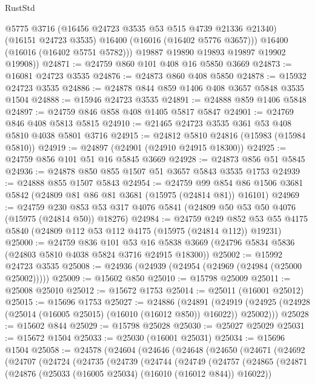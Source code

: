 \begin{lexlean}{RustStd}
\begin{coremodule}
            @5775
            @3716
            (@16456 @24723 @3535 @53 @515 @4739 @21336 @21340)
            (@16151 @24723 @3535)
            @16400
            (@16016 (@16402 @5776 @3657)))
          @16400
          (@16016 (@16402 @5751 @5782)))
        @19887
        @19890
        @19893
        @19897
        @19902
        @19908))
@24871 := @24759 @860 @101 @408 @16 @5850 @3669
@24873 := @16081 @24723 @3535
@24876 := @24873 @860 @408 @5850
@24878 := @15932 @24723 @3535
@24886 := @24878 @844 @859 @1406 @408 @3657 @5848 @3535 @1504
@24888 := @15946 @24723 @3535
@24891 := @24888 @859 @1406 @5848
@24897 := @24759 @846 @858 @408 @1405 @5817 @5847
@24901 := @24769 @846 @408 @5813 @5815
@24910 := @21465 @24723 @3535 @361 @53 @408 @5810 @4038 @5801 @3716
@24915 := @24812 @5810 @24816 (@15983 (@15984 @5810))
@24919 := @24897 (@24901 (@24910 @24915 @18300))
@24925 := @24759 @856 @101 @51 @16 @5845 @3669
@24928 := @24873 @856 @51 @5845
@24936 := @24878 @850 @855 @1507 @51 @3657 @5843 @3535 @1753
@24939 := @24888 @855 @1507 @5843
@24954 := @24759
    @99
    @854
    @86
    @1506
    @3681
    @5842
    (@24809 @81 @86 @81 @3681 (@15975 (@24814 @81)) @16101)
@24969 := @24759
    @230
    @853
    @53
    @317
    @4076
    @5841
    (@24809 @50 @53 @50 @4076 (@15975 (@24814 @50)) @18276)
@24984 := @24759
    @249
    @852
    @53
    @55
    @4175
    @5840
    (@24809 @112 @53 @112 @4175 (@15975 (@24814 @112)) @19231)
@25000 := @24759
    @836
    @101
    @53
    @16
    @5838
    @3669
    (@24796 @5834 @5836 (@24803 @5810 @4038 @5824 @3716 @24915 @18300))
@25002 := @15992 @24723 @3535
@25008 := @24936 (@24939 (@24954 (@24969 (@24984 (@25000 @25002)))))
@25009 := @15602 @850
@25010 := @15798 @25009
@25011 := @25008 @25010
@25012 := @15672 @1753
@25014 := @25011 (@16001 @25012)
@25015 := @15696 @1753
@25027 := @24886
    (@24891
      (@24919 (@24925 (@24928 (@25014 (@16005 @25015) (@16010 (@16012 @850)) @16022)) @25002)))
@25028 := @15602 @844
@25029 := @15798 @25028
@25030 := @25027 @25029
@25031 := @15672 @1504
@25033 := @25030 (@16001 @25031)
@25034 := @15696 @1504
@25058 := @24578
    (@24604
      (@24646
        (@24648
          (@24650
            (@24671
              (@24692
                (@24707
                  (@24724
                    (@24735
                      (@24739
                        (@24744
                          (@24749
                            (@24757
                              (@24865
                                (@24871
                                  (@24876 (@25033 (@16005 @25034) (@16010 (@16012 @844)) @16022))

\end{coremodule}
\end{lexlean}
